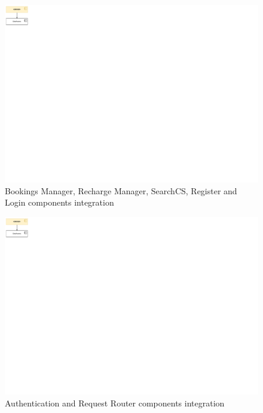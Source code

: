 \documentclass[11pt]{article}
\begin{document}
\newpage

\begin{figure}[!ht]
    \centering
    \includegraphics[page={3}, trim=0cm 27cm 26.5cm 0cmm, width=\linewidth, clip]{IntegrationDiagram.pdf}
    \caption{Bookings Manager, Recharge Manager, SearchCS, Register and Login components integration}
\end{figure}

\begin{figure}[!ht]
    \centering
    \includegraphics[page={4}, trim=0cm 22.5cm 26.5cm 0cmm, width=\linewidth, clip]{IntegrationDiagram.pdf}
    \caption{Authentication and Request Router components integration}
\end{figure}

\newpage
\end{document}

